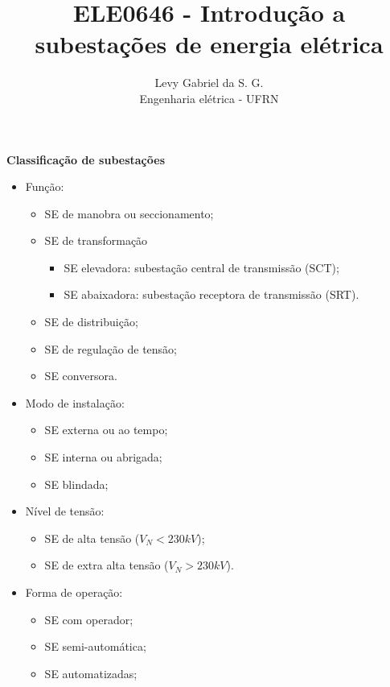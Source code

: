 \title{ELE0646 - Introdução a subestações de energia elétrica}
\author{Levy Gabriel da S. G. \\ Engenharia elétrica - UFRN}

\maketitle
\thispagestyle{fancy}

\textbf{Classificação de subestações}
\begin{itemize}
    \item Função:
    \begin{itemize} 
        \item SE de manobra ou seccionamento;
        \item SE de transformação
        \begin{itemize} 
            \item SE elevadora: subestação central de transmissão (SCT);
            \item SE abaixadora: subestação receptora de transmissão (SRT).
        \end{itemize}
        \item SE de distribuição;
        \item SE de regulação de tensão;
        \item SE conversora.
    \end{itemize}
    \item Modo de instalação:
    \begin{itemize}
        \item SE externa ou ao tempo;
        \item SE interna ou abrigada;
        \item SE blindada;
    \end{itemize}
    \item Nível de tensão:
    \begin{itemize}
        \item SE de alta tensão ($V_N<230kV$);
        \item SE de extra alta tensão ($V_N>230kV$).
    \end{itemize}
    \item Forma de operação:
    \begin{itemize}
        \item SE com operador;
        \item SE semi-automática;
        \item SE automatizadas;
    \end{itemize}
\end{itemize}


